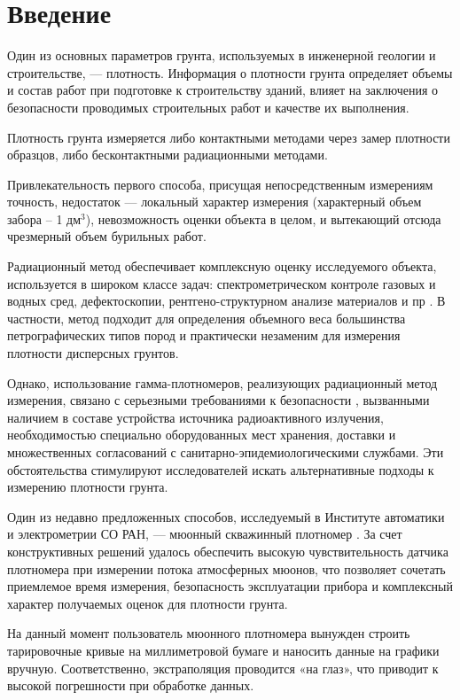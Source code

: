 \chapter*{Введение}							%

Один из основных параметров грунта, используемых в инженерной геологии и строительстве, ---
плотность. Информация о плотности грунта 
определяет объемы и состав работ при подготовке к строительству зданий, влияет на заключения о 
безопасности проводимых строительных работ и качестве их выполнения\cite{gost5180, souzdornii}. 

Плотность грунта измеряется либо контактными методами через замер плотности образцов, 
либо бесконтактными радиационными методами.

Привлекательность первого способа, присущая непосредственным измерениям точность, недостаток ---
локальный характер измерения (характерный объем забора – 1 дм$^{3}$), невозможность оценки объекта в целом,
и вытекающий отсюда чрезмерный объем бурильных работ.

Радиационный метод обеспечивает комплексную оценку исследуемого объекта, используется в широком классе задач:
спектрометрическом контроле газовых и водных сред, дефектоскопии, рентгено-структурном анализе материалов и пр \cite{gammaquant}. 
В частности, метод подходит для определения объемного веса большинства петрографических типов пород и практически 
незаменим для измерения плотности дисперсных грунтов. 

Однако, использование гамма-плотномеров, реализующих радиационный метод измерения, связано с серьезными требованиями 
к безопасности \cite{gost23061}, вызванными наличием в составе устройства источника радиоактивного излучения, необходимостью 
специально оборудованных мест хранения, доставки и множественных согласований с санитарно-эпидемиологическими службами. 
Эти обстоятельства стимулируют исследователей искать альтернативные подходы к измерению плотности грунта. 

Один из недавно предложенных способов, исследуемый в Институте автоматики и электрометрии СО РАН, ---
мюонный скважинный плотномер \cite{patentdensitometer}. За счет конструктивных решений удалось обеспечить высокую чувствительность 
датчика плотномера при измерении потока атмосферных мюонов, что позволяет сочетать приемлемое время измерения, 
безопасность эксплуатации прибора и комплексный характер получаемых оценок для плотности грунта.

На данный момент пользователь мюонного плотномера вынужден строить тарировочные кривые на миллиметровой бумаге 
и наносить данные на графики вручную. Соответственно, экстраполяция проводится «на глаз», что приводит к высокой 
погрешности при обработке данных.

